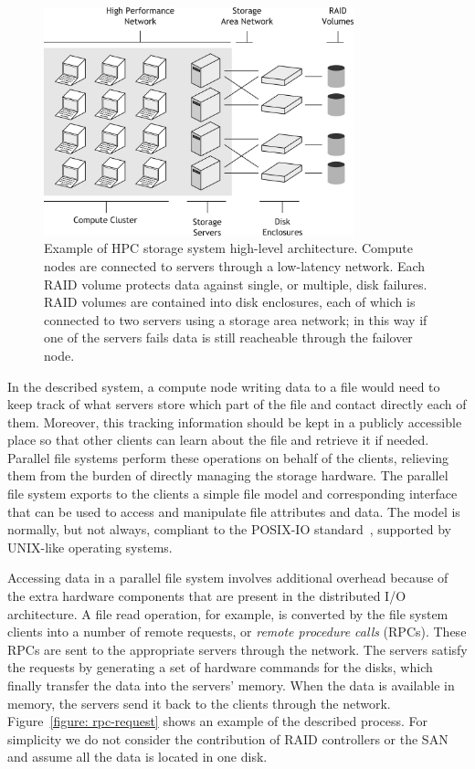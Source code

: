 \begin{figure}[!htb]
\centering
\includegraphics[width=0.8\textwidth]{figures/hpc-io-arch}
\caption{Example of HPC storage system high-level architecture. Compute nodes are connected to servers through a low-latency network. Each RAID volume protects data against single, or multiple,
    disk failures. RAID volumes are contained into disk enclosures, each of which is connected to two servers using a storage area network; in this way if one of the servers fails data is still
    reacheable through the failover node.}
\label{figure: hpc-io-arch}
\end{figure}

In the described system, a compute node writing data to a file would need to keep track of what servers store which part of the file and contact directly each of them. Moreover, this tracking information should be 
kept in a publicly accessible place so that other clients can learn about the file and retrieve it if needed. Parallel file systems perform these operations on behalf of the clients, relieving them from the burden 
of directly managing the storage hardware. The parallel file system exports to the clients a simple file model and corresponding interface that can be used to access and manipulate file attributes and data. The model 
is normally, but not always, compliant to the POSIX-IO standard~\cite{POSIX}, supported by UNIX-like operating systems.

Accessing data in a parallel file system involves additional overhead because of the extra hardware components that are present in the distributed I/O architecture. A file read operation, for example, is converted by 
the file system clients into a number of remote requests, or \textit{remote procedure calls} (RPCs). These RPCs are sent to the appropriate servers through the network. The servers satisfy the requests by generating a 
set of hardware commands for the disks, which finally transfer the data into the servers' memory. When the data is available in memory, the servers send it back to the clients through the network. 
Figure~\ref{figure: rpc-request} shows an example of the described process. For simplicity we do not consider the contribution of RAID controllers or the SAN and assume all the data is located in one disk.

